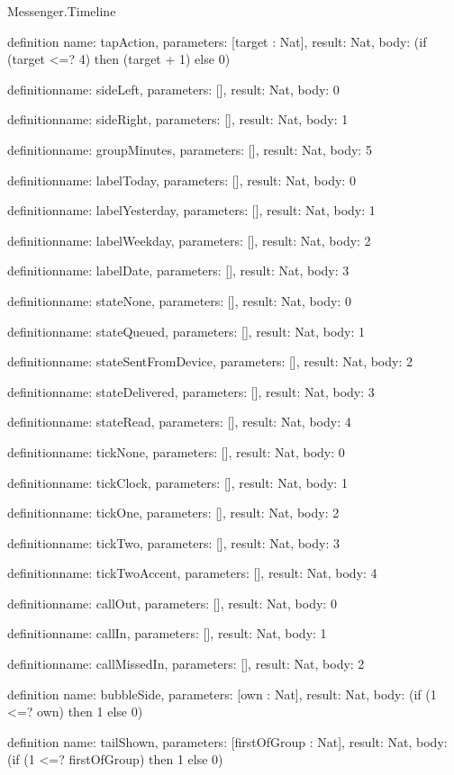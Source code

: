 \begin{lexlean}{Messenger.Timeline}
\begin{semanticmodule}
definition{
  name: tapAction,
  parameters: [target : Nat],
  result: Nat,
  body: (if (target <=? 4) then (target + 1) else 0)
}

definition{name: sideLeft, parameters: [], result: Nat, body: 0}

definition{name: sideRight, parameters: [], result: Nat, body: 1}

definition{name: groupMinutes, parameters: [], result: Nat, body: 5}

definition{name: labelToday, parameters: [], result: Nat, body: 0}

definition{name: labelYesterday, parameters: [], result: Nat, body: 1}

definition{name: labelWeekday, parameters: [], result: Nat, body: 2}

definition{name: labelDate, parameters: [], result: Nat, body: 3}

definition{name: stateNone, parameters: [], result: Nat, body: 0}

definition{name: stateQueued, parameters: [], result: Nat, body: 1}

definition{name: stateSentFromDevice, parameters: [], result: Nat, body: 2}

definition{name: stateDelivered, parameters: [], result: Nat, body: 3}

definition{name: stateRead, parameters: [], result: Nat, body: 4}

definition{name: tickNone, parameters: [], result: Nat, body: 0}

definition{name: tickClock, parameters: [], result: Nat, body: 1}

definition{name: tickOne, parameters: [], result: Nat, body: 2}

definition{name: tickTwo, parameters: [], result: Nat, body: 3}

definition{name: tickTwoAccent, parameters: [], result: Nat, body: 4}

definition{name: callOut, parameters: [], result: Nat, body: 0}

definition{name: callIn, parameters: [], result: Nat, body: 1}

definition{name: callMissedIn, parameters: [], result: Nat, body: 2}

definition{
  name: bubbleSide,
  parameters: [own : Nat],
  result: Nat,
  body: (if (1 <=? own) then 1 else 0)
}

definition{
  name: tailShown,
  parameters: [firstOfGroup : Nat],
  result: Nat,
  body: (if (1 <=? firstOfGroup) then 1 else 0)
}


\end{semanticmodule}
\end{lexlean}
